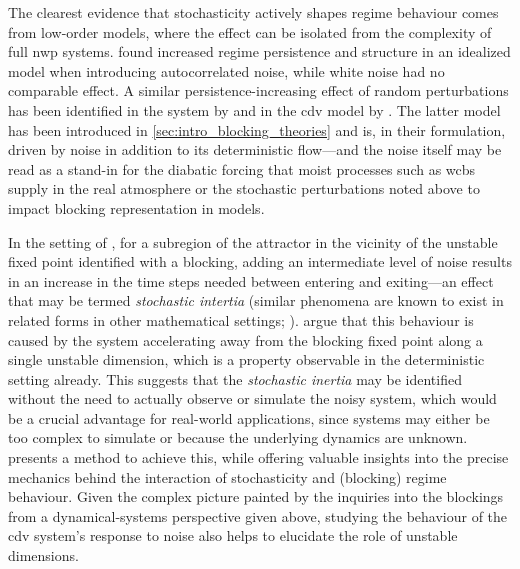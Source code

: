 The clearest evidence that stochasticity actively shapes regime behaviour comes
from low-order models, where the effect can be isolated from the complexity of
full \gls{nwp} systems. \textcite{christensenSimulatingWeatherRegimes2015}
found increased regime persistence and structure in an idealized model when
introducing autocorrelated noise, while white noise had no comparable effect.
A similar persistence-increasing effect of random perturbations has been
identified in the \textcite{lorenzDeterministicNonperiodicFlow1963} system by
\textcite{kwasniokEnhancedRegimePredictability2014} and in the
\gls{cdv} model by
\textcite{dorringtonInteractionStochasticForcing2023}. The latter model
has been introduced in \cref{sec:intro_blocking_theories} and is, in their
formulation, driven by
noise in addition to its deterministic flow---and the noise itself may be
read as a stand-in for the diabatic forcing that moist processes
such as \glspl{wcb} supply in the real atmosphere or the stochastic
perturbations noted above to impact blocking representation in models.

In the setting of \textcite{dorringtonInteractionStochasticForcing2023},
for a subregion of the attractor in the vicinity of the
unstable
fixed point identified with a blocking, adding an intermediate level of noise
results in an increase in the time steps needed between entering and
exiting---an effect that may be termed \emph{stochastic intertia}
(similar phenomena
are known to exist in related forms in other mathematical settings;
\textcite{franaszekInfluenceNoiseMean1991,reimannNoisyOnedimensionalMaps1996,
    altmannNoiseEnhancedTrappingChaotic2010}).
\textcite{dorringtonInteractionStochasticForcing2023} argue that this
behaviour is caused by the system accelerating away from the blocking
fixed point along a single unstable dimension, which is a property observable
in the deterministic setting already. This suggests that the \emph{stochastic
    inertia} may be identified without the need to actually observe or simulate
the noisy system, which would be a crucial advantage for real-world
applications, since systems may either be too complex to simulate or because
the underlying dynamics are unknown.  presents
a method to achieve this, while offering valuable insights into the precise
mechanics behind the interaction of stochasticity and (blocking) regime
behaviour. Given the complex picture painted by the inquiries into the
blockings from a dynamical-systems perspective given above, studying the
behaviour of the \gls{cdv} system's response to noise also helps to elucidate
the role of unstable dimensions.

